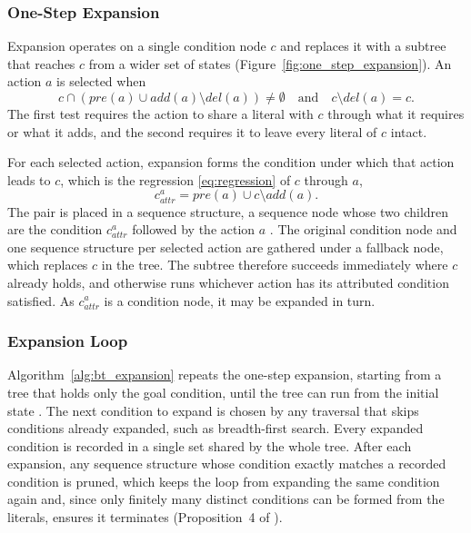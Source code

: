     \subsubsection{One-Step Expansion}
    \label{subsec:one-step}
    
    Expansion operates on a single condition node $c$ and replaces it with a subtree that reaches $c$ from a wider set of states (Figure~\ref{fig:one_step_expansion}).
    An action $a$ is selected when
    \begin{equation}
      c \cap (pre(a) \cup add(a) \setminus del(a)) \neq \emptyset
      \quad\text{and}\quad
      c \setminus del(a) = c.
      \label{eq:action-selection}
    \end{equation}
    The first test requires the action to share a literal with $c$ through what it requires or what it adds, and the second requires it to leave every literal of $c$ intact.

    For each selected action, expansion forms the condition under which that action leads to $c$, which is the regression \eqref{eq:regression} of $c$ through $a$,
    \begin{equation}
      c^a_{attr} = pre(a) \cup c \setminus add(a).
      \label{eq:cattr}
    \end{equation}
    The pair is placed in a sequence structure, a sequence node whose two children are the condition $c^a_{attr}$ followed by the action $a$ \cite{cai2021}.
    The original condition node and one sequence structure per selected action are gathered under a fallback node, which replaces $c$ in the tree.
    The subtree therefore succeeds immediately where $c$ already holds, and otherwise runs whichever action has its attributed condition satisfied.
    As $c^a_{attr}$ is a condition node, it may be expanded in turn.

    \subsubsection{Expansion Loop}
    \label{subsec:expansion_loop}
    Algorithm~\ref{alg:bt_expansion} repeats the one-step expansion, starting from a tree that holds only the goal condition, until the tree can run from the initial state \cite{cai2021}.
    The next condition to expand is chosen by any traversal that skips conditions already expanded, such as breadth-first search.
    Every expanded condition is recorded in a single set shared by the whole tree.
    After each expansion, any sequence structure whose condition exactly matches a recorded condition is pruned, which keeps the loop from expanding the same condition again and, since only finitely many distinct conditions can be formed from the literals, ensures it terminates (Proposition~4 of \cite{cai2021}).
    
